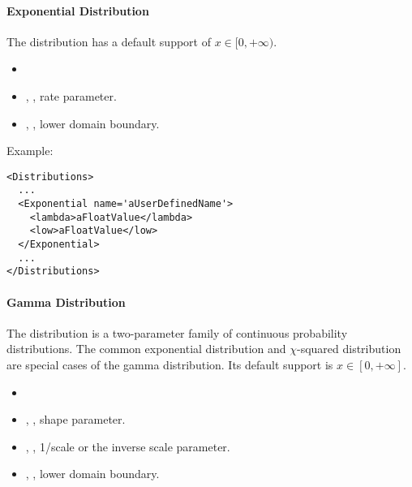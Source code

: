 \paragraph{Exponential Distribution}
\label{Exponential}
The  distribution has a default support of
$x \in [0, +\infty)$.

%
\attrIntro
\vspace{-5mm}
\begin{itemize}
  \itemsep0em
  \item \nameDescription
\end{itemize}
\vspace{-5mm}
\subnodeIntro
\begin{itemize}
  \item {}, , rate parameter.
  \item {}, , lower domain
     boundary. 
\end{itemize}

Example:
\begin{lstlisting}[style=XML]
<Distributions>
  ...
  <Exponential name='aUserDefinedName'>
    <lambda>aFloatValue</lambda>
    <low>aFloatValue</low>
  </Exponential>
  ...
</Distributions>
\end{lstlisting}

\paragraph{Gamma Distribution}
\label{Gamma}
The  distribution is a two-parameter family of continuous
probability distributions.
%
The common exponential distribution and $\chi$-squared distribution are special
cases of the gamma distribution.
%
Its default support is $x \in [0,+\infty]$.

%
\attrIntro
\vspace{-5mm}
\begin{itemize}
  \itemsep0em
  \item \nameDescription
\end{itemize}
\vspace{-5mm}
\subnodesIntro
\begin{itemize}
  \item {}, , shape parameter.
  \item {}, , 1/scale or the
  inverse scale parameter. 
  \item {}, , lower domain
  boundary. 
\end{itemize}

